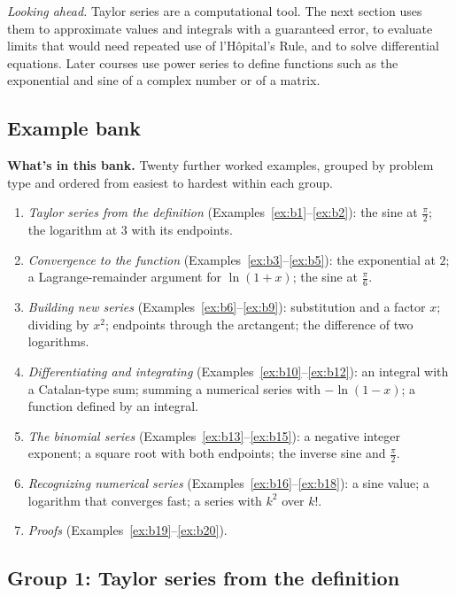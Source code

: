 \documentclass[11pt]{article}
\begin{document}
\emph{Looking ahead.} Taylor series are a computational tool. The next section uses them to approximate values and integrals with a guaranteed error, to evaluate limits that would need repeated use of l'H\^opital's Rule, and to solve differential equations. Later courses use power series to define functions such as the exponential and sine of a complex number or of a matrix.


\subsection*{Example bank}

\textbf{What's in this bank.} Twenty further worked examples, grouped by problem type and ordered from easiest to hardest within each group.
\begin{enumerate}[nosep]
  \item \emph{Taylor series from the definition} (Examples~\ref{ex:b1}--\ref{ex:b2}): the sine at $\frac\pi2$; the logarithm at $3$ with its endpoints.
  \item \emph{Convergence to the function} (Examples~\ref{ex:b3}--\ref{ex:b5}): the exponential at $2$; a Lagrange-remainder argument for $\ln(1+x)$; the sine at $\frac\pi6$.
  \item \emph{Building new series} (Examples~\ref{ex:b6}--\ref{ex:b9}): substitution and a factor $x$; dividing by $x^2$; endpoints through the arctangent; the difference of two logarithms.
  \item \emph{Differentiating and integrating} (Examples~\ref{ex:b10}--\ref{ex:b12}): an integral with a Catalan-type sum; summing a numerical series with $-\ln(1-x)$; a function defined by an integral.
  \item \emph{The binomial series} (Examples~\ref{ex:b13}--\ref{ex:b15}): a negative integer exponent; a square root with both endpoints; the inverse sine and $\frac\pi2$.
  \item \emph{Recognizing numerical series} (Examples~\ref{ex:b16}--\ref{ex:b18}): a sine value; a logarithm that converges fast; a series with $k^2$ over $k!$.
  \item \emph{Proofs} (Examples~\ref{ex:b19}--\ref{ex:b20}).
\end{enumerate}

\subsection*{Group 1: Taylor series from the definition}
\end{document}
